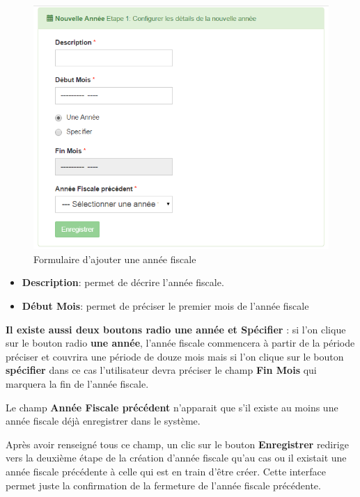 \documentclass[12pt,a4paper]{report}
\begin{document}
\begin{figure}[h]
\begin{center}
\includegraphics[width=12cm]{pic/FormCreationAnnFisc.png}
\end{center}
\caption{Formulaire d'ajouter une année fiscale}
\label{Formulaire d'ajouter une année fiscale}
\end{figure}
\begin{itemize}
\item \textbf{Description}: permet de décrire l'année fiscale.
\item \textbf{Début Mois}: permet de préciser le premier mois de l'année fiscale
\end{itemize}
\textbf{Il existe aussi deux boutons radio une année et Spécifier }: si l'on clique sur le bouton radio \textbf{une année}, l'année fiscale commencera à partir de la période préciser et couvrira une période de douze mois mais si l'on clique sur le bouton \textbf{spécifier} dans ce cas l'utilisateur devra préciser le champ \textbf{Fin Mois} qui marquera la fin de l'année fiscale.

Le champ \textbf{Année Fiscale précédent} n'apparait que s'il existe au moins une année fiscale déjà enregistrer dans le système. 

Après avoir renseigné tous ce champ, un clic sur le bouton \textbf{Enregistrer} redirige vers la deuxième étape de la création d'année fiscale qu'au cas ou il existait une année fiscale précédente à celle qui est en train d'être créer. Cette interface permet juste la confirmation de la fermeture de l'année fiscale précédente.
\end{document}
